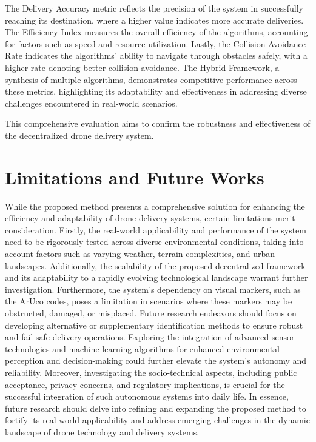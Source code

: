 \documentclass[preprint,12pt]{elsarticle}
\begin{document}
The Delivery Accuracy metric reflects the precision of the system in successfully reaching its destination, where a higher value indicates more accurate deliveries. The Efficiency Index measures the overall efficiency of the algorithms, accounting for factors such as speed and resource utilization. Lastly, the Collision Avoidance Rate indicates the algorithms' ability to navigate through obstacles safely, with a higher rate denoting better collision avoidance. The Hybrid Framework, a synthesis of multiple algorithms, demonstrates competitive performance across these metrics, highlighting its adaptability and effectiveness in addressing diverse challenges encountered in real-world scenarios.

This comprehensive evaluation aims to confirm the robustness and effectiveness of the decentralized drone delivery system.

\section{Limitations and Future Works}
While the proposed method presents a comprehensive solution for enhancing the efficiency and adaptability of drone delivery systems, certain limitations merit consideration. Firstly, the real-world applicability and performance of the system need to be rigorously tested across diverse environmental conditions, taking into account factors such as varying weather, terrain complexities, and urban landscapes. Additionally, the scalability of the proposed decentralized framework and its adaptability to a rapidly evolving technological landscape warrant further investigation. Furthermore, the system's dependency on visual markers, such as the ArUco codes, poses a limitation in scenarios where these markers may be obstructed, damaged, or misplaced. Future research endeavors should focus on developing alternative or supplementary identification methods to ensure robust and fail-safe delivery operations. Exploring the integration of advanced sensor technologies and machine learning algorithms for enhanced environmental perception and decision-making could further elevate the system's autonomy and reliability. Moreover, investigating the socio-technical aspects, including public acceptance, privacy concerns, and regulatory implications, is crucial for the successful integration of such autonomous systems into daily life. In essence, future research should delve into refining and expanding the proposed method to fortify its real-world applicability and address emerging challenges in the dynamic landscape of drone technology and delivery systems.
\end{document}
